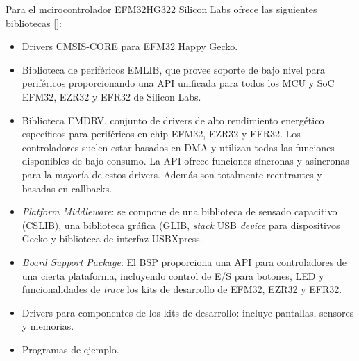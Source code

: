 
Para el mcirocontrolador EFM32HG322 Silicon Labs ofrece las siguientes bibliotecas []:

\begin{itemize}
\item
Drivers CMSIS-CORE para EFM32 Happy Gecko.
\item
Biblioteca de periféricos EMLIB, que provee soporte de bajo nivel para periféricos proporcionando una API unificada para todos los MCU y SoC EFM32, EZR32 y EFR32 de Silicon Labs.
\item
Biblioteca EMDRV, conjunto de drivers de alto rendimiento energético específicos para periféricos en chip EFM32, EZR32 y EFR32. Los controladores suelen estar basados en DMA y utilizan todas las funciones disponibles de bajo consumo. La API ofrece funciones síncronas y asíncronas para la mayoría de estos drivers. Además son totalmente reentrantes y basadas en callbacks.
\item
\emph{Platform Middleware}: se compone de una biblioteca de sensado capacitivo (CSLIB), una biblioteca gráfica (GLIB, \emph{stack} USB \emph{device} para dispositivos Gecko y biblioteca de interfaz USBXpress.
\item
\emph{Board Support Package}: El BSP proporciona una API para controladores de una cierta plataforma, incluyendo control de E/S para botones, LED y funcionalidades de \emph{trace} los kits de desarrollo de EFM32, EZR32 y EFR32.
\item
Drivers para componentes de los kits de desarrollo: incluye pantallas, sensores y memorias.
\item
Programas de ejemplo.
\end{itemize}
